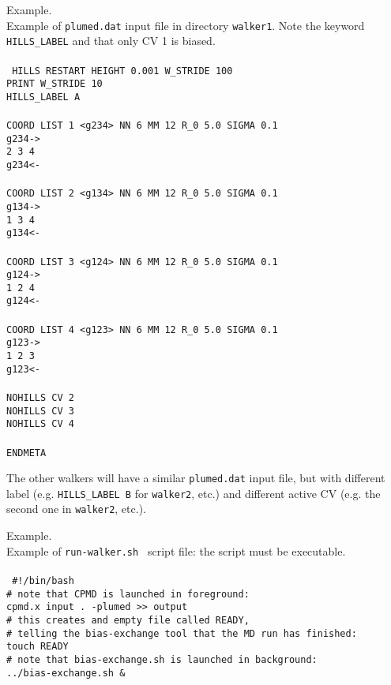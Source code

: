 \documentclass[12pt,fleqn]{report}
\newcommand{\esempio}[1]{
\vspace{10pt}
\begin{flushright}
\colorbox{light-gray}{
   \begin{minipage}{13cm}
       \scriptsize{
{\fontfamily{phv} \fontseries{b}
 \selectfont Example. \\
 \fontseries{m} \selectfont #1 } }
\end{minipage}}
\end{flushright}
\vspace{20pt}
}
\begin{document}
\esempio{Example of {\tt plumed.dat} input file in directory {\tt walker1}. Note the keyword {\tt HILLS\_LABEL}
and that only CV 1 is biased.\\ \\
{\tt
HILLS RESTART HEIGHT 0.001 W\_STRIDE 100 \\
PRINT W\_STRIDE 10 \\
HILLS\_LABEL A \\
\\
COORD LIST 1 <g234> NN 6 MM 12 R\_0 5.0 SIGMA 0.1 \\
g234-> \\
 2 3 4 \\
g234<- \\
 \\
COORD LIST 2 <g134> NN 6 MM 12 R\_0 5.0 SIGMA 0.1 \\
g134-> \\
 1 3 4 \\
g134<- \\
 \\
COORD LIST 3 <g124> NN 6 MM 12 R\_0 5.0 SIGMA 0.1 \\
g124-> \\
 1 2 4 \\
g124<- \\
 \\
COORD LIST 4 <g123> NN 6 MM 12 R\_0 5.0 SIGMA 0.1 \\
g123-> \\
 1 2 3 \\
g123<- \\
 \\
NOHILLS CV 2 \\
NOHILLS CV 3 \\
NOHILLS CV 4 \\
 \\
ENDMETA \\
}
}

The other walkers will have a similar {\tt plumed.dat} input file, but with different label 
(e.g. {\tt HILLS\_LABEL B} for {\tt walker2}, etc.) 
and different active CV (e.g. the second one in {\tt walker2}, etc.).

\esempio{Example of {\tt run-walker.sh } script file: the script must be executable.\\ \\
{\tt
\#!/bin/bash \\
\# note that CPMD is launched in foreground: \\
cpmd.x input . -plumed >> output \\
\# this creates and empty file called READY, \\
\# telling the bias-exchange tool that the MD run has finished:\\
touch READY \\
\# note that bias-exchange.sh is launched in background:\\
../bias-exchange.sh \&
}
}
\end{document}
